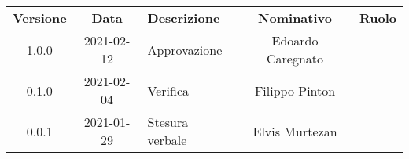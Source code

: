 {
    \renewcommand{\arraystretch}{1.5}
    \centering
    \begin{longtable}{ c c  C{4cm}  c  c }
        \rowcolor{\primaryColor}
        \textcolor{\secondaryColor}{
        \textbf{Versione}}     & \textcolor{\secondaryColor}{\textbf{Data}}       & \textcolor{\secondaryColor}
        {\textbf{Descrizione}} & \textcolor{\secondaryColor}{\textbf{Nominativo}} & \textcolor{\secondaryColor}{\textbf{Ruolo}}                          \\


        1.0.0                  & 2021-02-12                                      & Approvazione                               & Edoardo Caregnato & \responsabile{} \\
        0.1.0                  & 2021-02-04                                      & Verifica                                    & Filippo Pinton & \verificatore{} \\
        0.0.1                  & 2021-01-29                                      & Stesura verbale                            & Elvis Murtezan & \redattore{}    \\
    \end{longtable}
}